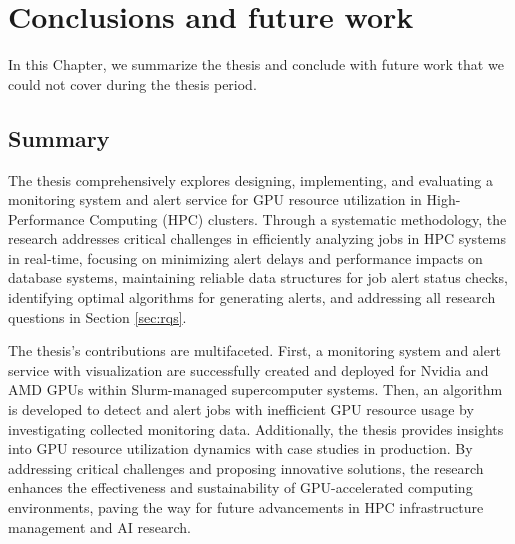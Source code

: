 \chapter{Conclusions and future work}
\label{chap:conclusions}
In this Chapter, we summarize the thesis and conclude with future work that we could not cover during the thesis period.

\section{Summary}

The thesis comprehensively explores designing, implementing, and evaluating a monitoring system and alert service for GPU resource utilization in High-Performance Computing (HPC) clusters. Through a systematic methodology, the research addresses critical challenges in efficiently analyzing jobs in HPC systems in real-time, focusing on minimizing alert delays and performance impacts on database systems, maintaining reliable data structures for job alert status checks, identifying optimal algorithms for generating alerts, and addressing all research questions in Section \ref{sec:rqs}.

The thesis's contributions are multifaceted. First, a monitoring system and alert service with visualization are successfully created and deployed for Nvidia and AMD GPUs within Slurm-managed supercomputer systems. Then, an algorithm is developed to detect and alert jobs with inefficient GPU resource usage by investigating collected monitoring data. Additionally, the thesis provides insights into GPU resource utilization dynamics with case studies in production. By addressing critical challenges and proposing innovative solutions, the research enhances the effectiveness and sustainability of GPU-accelerated computing environments, paving the way for future advancements in HPC infrastructure management and AI research.



